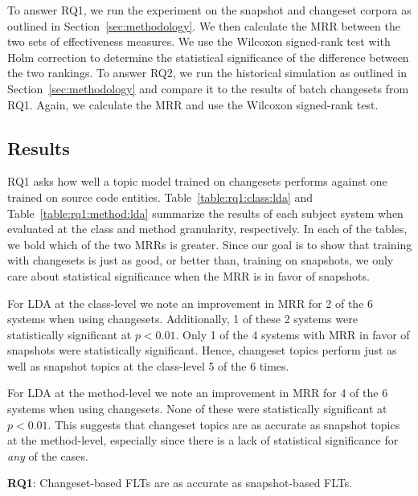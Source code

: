 To answer RQ1, we run the experiment on the snapshot and changeset corpora as
outlined in Section~\ref{sec:methodology}.  We then calculate the MRR between
the two sets of effectiveness measures.  We use the Wilcoxon signed-rank test
with Holm correction to determine the statistical significance of the difference
between the two rankings.  To answer RQ2, we run the historical simulation as
outlined in Section~\ref{sec:methodology} and compare it to the results of batch
changesets from RQ1.  Again, we calculate the MRR and use the Wilcoxon
signed-rank test.



\subsection{Results}



RQ1 asks how well a topic model trained on changesets performs against one
trained on source code entities.  Table~\ref{table:rq1:class:lda} and
Table~\ref{table:rq1:method:lda} summarize the results of each subject system
when evaluated at the class and method granularity, respectively.  In each of
the tables, we bold which of the two MRRs is greater.  Since our goal is to show
that training with changesets is just as good, or better than, training on
snapshots, we only care about statistical significance when the MRR is in favor
of snapshots.

For LDA at the class-level we note an improvement in MRR for 2 of the 6 systems
when using changesets.  Additionally, 1 of these 2 systems were statistically
significant at $p<0.01$.  Only 1 of the 4 systems with MRR in favor of snapshots
were statistically significant.  Hence, changeset topics perform just as well as
snapshot topics at the class-level 5 of the 6 times.

For LDA at the method-level we note an improvement in MRR for 4 of the 6 systems
when using changesets.  None of these were statistically significant at
$p<0.01$.  This suggests that changeset topics are as accurate as snapshot
topics at the method-level, especially since there is a lack of statistical
significance for \emph{any} of the cases.

\begin{framed}
    \textbf{RQ1}:
    Changeset-based FLTs are as accurate as snapshot-based FLTs.
\end{framed}

